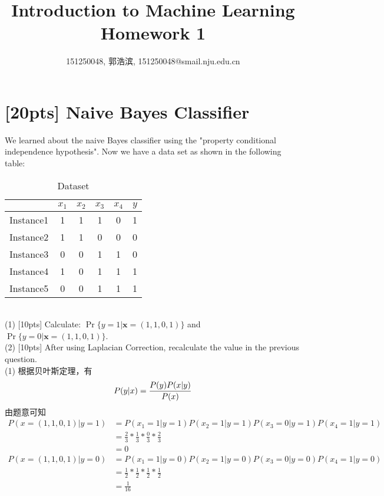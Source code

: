 \documentclass{article}
\title{Introduction to Machine Learning\\Homework 1}
\author{151250048, 郭浩滨, 151250048@smail.nju.edu.cn}
\begin{document}
	\setlength{\baselineskip}{20pt}
	\maketitle
	\section{[20pts] Naive Bayes Classifier}
	
	We learned about the naive Bayes classifier using the "property conditional independence hypothesis". Now we have a data set as shown in the following table: \\
	\begin{table}[htp]
		\centering
		\caption{Dataset}\label{tab:aStrangeTable}
	\begin{tabular}{c|ccccc}
		\hline 
		& $x_1$ & $x_2$ & $x_3$ & $x_4$ & $y$ \\ 
		\hline 
	Instance1	& 1 & 1 & 1 & 0 & 1 \\ 
		\hline 
	Instance2	& 1 & 1 & 0 & 0 & 0 \\ 
		\hline 
	Instance3	& 0 & 0 & 1 & 1 & 0 \\ 
		\hline 
	Instance4	& 1 & 0 & 1 & 1 & 1 \\ 
		\hline 
	Instance5	& 0 & 0 & 1 & 1 & 1 \\ 
		\hline 
	\end{tabular}
	\end{table} \\
	(1) [10pts] Calculate: $\Pr\{ y=1 | \mathbf{x}=(1,1,0,1) \}$ and $\Pr\{ y=0 | \mathbf{x}=(1,1,0,1) \}$. \\
	(2) [10pts] After using Laplacian Correction, recalculate the value in the previous question. \\
	(1) 根据贝叶斯定理，有
		\begin{equation*}
		P(y|x) = \frac{P(y)P(x|y)}{P(x)} \\
		\end{equation*}
		由题意可知
		\begin{equation*}
		\begin{aligned}
		P(x=(1,1,0,1)|y=1) 
		&= P(x_1=1|y=1)P(x_2=1|y=1)P(x_3=0|y=1)P(x_4=1|y=1) \\
		&= \frac{2}{3}*\frac{1}{3}*\frac{0}{3}*\frac{2}{3} \\
		&= 0 \\
		P(x=(1,1,0,1)|y=0) 
		&= P(x_1=1|y=0)P(x_2=1|y=0)P(x_3=0|y=0)P(x_4=1|y=0) \\
		&= \frac{1}{2}*\frac{1}{2}*\frac{1}{2}*\frac{1}{2} \\
		&= \frac{1}{16} \\
		\end{aligned}
		\end{equation*}
\end{document}
